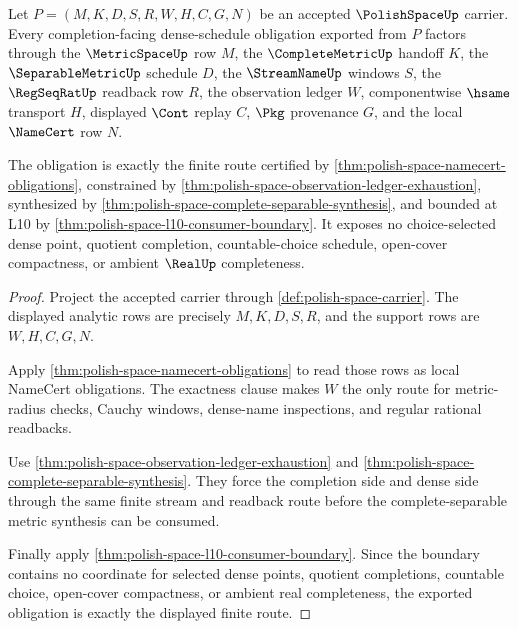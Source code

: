 \begin{theorem}
\label{thm:polish-space-completion-dense-schedule-obligation}
Let $P=(M,K,D,S,R,W,H,C,G,N)$ be an accepted $\PolishSpaceUp$ carrier. Every completion-facing dense-schedule obligation exported from $P$ factors through the $\MetricSpaceUp$ row $M$, the $\CompleteMetricUp$ handoff $K$, the $\SeparableMetricUp$ schedule $D$, the $\StreamNameUp$ windows $S$, the $\RegSeqRatUp$ readback row $R$, the observation ledger $W$, componentwise $\hsame$ transport $H$, displayed $\Cont$ replay $C$, $\Pkg$ provenance $G$, and the local $\NameCert$ row $N$.

The obligation is exactly the finite route certified by \autoref{thm:polish-space-namecert-obligations}, constrained by \autoref{thm:polish-space-observation-ledger-exhaustion}, synthesized by \autoref{thm:polish-space-complete-separable-synthesis}, and bounded at L10 by \autoref{thm:polish-space-l10-consumer-boundary}. It exposes no choice-selected dense point, quotient completion, countable-choice schedule, open-cover compactness, or ambient $\RealUp$ completeness.
\end{theorem}
\begin{proof}
Project the accepted carrier through \autoref{def:polish-space-carrier}. The displayed analytic rows are precisely $M,K,D,S,R$, and the support rows are $W,H,C,G,N$.

Apply \autoref{thm:polish-space-namecert-obligations} to read those rows as local NameCert obligations. The exactness clause makes $W$ the only route for metric-radius checks, Cauchy windows, dense-name inspections, and regular rational readbacks.

Use \autoref{thm:polish-space-observation-ledger-exhaustion} and \autoref{thm:polish-space-complete-separable-synthesis}. They force the completion side and dense side through the same finite stream and readback route before the complete-separable metric synthesis can be consumed.

Finally apply \autoref{thm:polish-space-l10-consumer-boundary}. Since the boundary contains no coordinate for selected dense points, quotient completions, countable choice, open-cover compactness, or ambient real completeness, the exported obligation is exactly the displayed finite route.
\end{proof}

